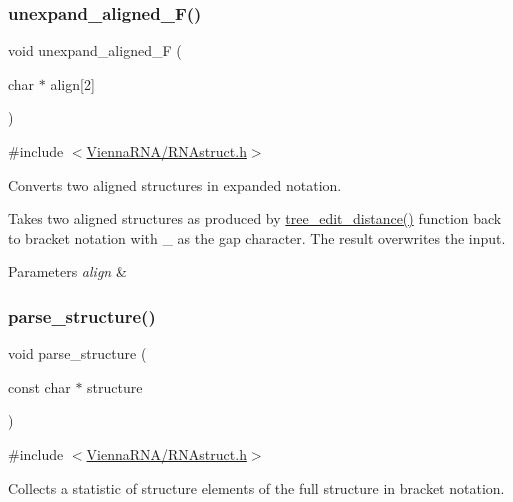 \subsubsection{\texorpdfstring{unexpand\+\_\+aligned\+\_\+\+F()}{unexpand\_aligned\_F()}}
{\footnotesize\ttfamily void unexpand\+\_\+aligned\+\_\+F (\begin{DoxyParamCaption}\item[{char $\ast$}]{align\mbox{[}2\mbox{]} }\end{DoxyParamCaption})}



{\ttfamily \#include $<$\hyperlink{RNAstruct_8h}{Vienna\+R\+N\+A/\+R\+N\+Astruct.\+h}$>$}



Converts two aligned structures in expanded notation. 

Takes two aligned structures as produced by \hyperlink{treedist_8h_a3b21f1925f7071f46d93431a835217bb}{tree\+\_\+edit\+\_\+distance()} function back to bracket notation with \textquotesingle{}\+\_\+\textquotesingle{} as the gap character. The result overwrites the input.


\begin{DoxyParams}{Parameters}
{\em align} & \\
\hline
\end{DoxyParams}
\mbox{\label{group__struct__utils_ga3c79042e6bf6f01706bf30ec9e69e8ac}} 
\subsubsection{\texorpdfstring{parse\+\_\+structure()}{parse\_structure()}}
{\footnotesize\ttfamily void parse\+\_\+structure (\begin{DoxyParamCaption}\item[{const char $\ast$}]{structure }\end{DoxyParamCaption})}



{\ttfamily \#include $<$\hyperlink{RNAstruct_8h}{Vienna\+R\+N\+A/\+R\+N\+Astruct.\+h}$>$}



Collects a statistic of structure elements of the full structure in bracket notation. 

